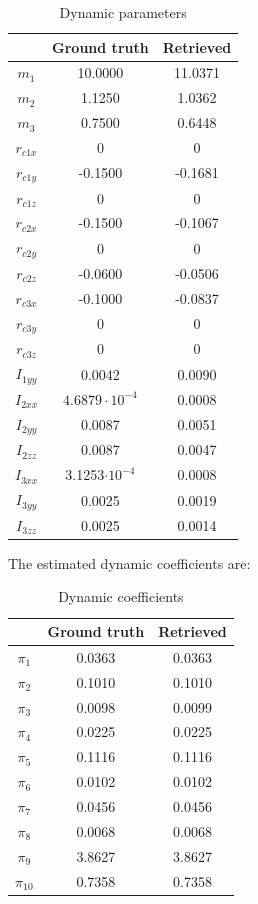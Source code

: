 \documentclass{article}
\begin{document}
\begin{table}[!htbp]
\centering
\begin{tabular}{|c|cc|}
\hline
& Ground truth & Retrieved\\ 
\hline
$m_1$ & 10.0000 & 11.0371\\
$m_2$ & 1.1250 & 1.0362\\
$m_3$ & 0.7500 & 0.6448\\
$r_{c1x}$ &  0 & 0\\
$r_{c1y}$ & -0.1500 & -0.1681\\
$r_{c1z}$ & 0 & 0\\
$r_{c2x}$ & -0.1500 & -0.1067\\
$r_{c2y}$ & 0 & 0\\
$r_{c2z}$ & -0.0600 & -0.0506\\
$r_{c3x}$ & -0.1000 & -0.0837\\
$r_{c3y}$ & 0 & 0\\
$r_{c3z}$ & 0 & 0\\
$I_{1yy}$ & 0.0042 & 0.0090\\
$I_{2xx}$ & $4.6879\cdot 10^{-4}$ & 0.0008\\
$I_{2yy}$ & 0.0087 & 0.0051\\
$I_{2zz}$ & 0.0087 & 0.0047\\
$I_{3xx}$ & 3.1253$\cdot 10^{-4}$ & 0.0008\\
$I_{3yy}$ & 0.0025 & 0.0019\\
$I_{3zz}$ & 0.0025 & 0.0014\\
\hline
\end{tabular}
\caption{Dynamic parameters}
\end{table}
\FloatBarrier

The estimated dynamic coefficients are:

\begin{table}[!htbp]
\centering
\begin{tabular}{|c|cc|}
\hline
& Ground truth & Retrieved\\ 
\hline
$\pi_1$ & 0.0363 & 0.0363\\
$\pi_2$ & 0.1010 & 0.1010\\
$\pi_3$ & 0.0098 & 0.0099\\
$\pi_4$ &  0.0225 &  0.0225\\
$\pi_5$ & 0.1116 & 0.1116\\
$\pi_6$ & 0.0102 & 0.0102\\
$\pi_7$ & 0.0456 & 0.0456\\
$\pi_8$ & 0.0068 & 0.0068\\
$\pi_9$ & 3.8627 & 3.8627\\
$\pi_{10}$ & 0.7358 & 0.7358\\
\hline
\end{tabular}
\caption{Dynamic coefficients}
\end{table}
\FloatBarrier
\end{document}
